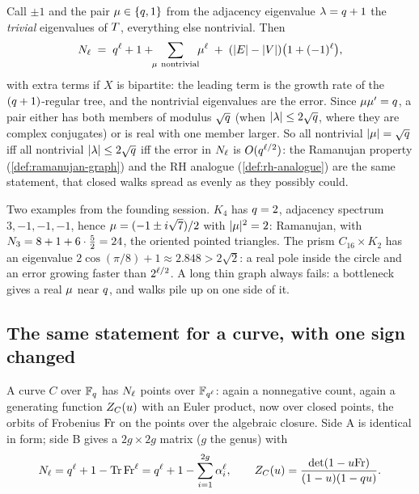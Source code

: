 Call $\pm1$ and the pair $\mu\in\{q,1\}$ from the adjacency eigenvalue $\lambda = q+1$ the
\emph{trivial} eigenvalues of $T$, everything else nontrivial. Then
\[
  N_{\ell} \;=\; q^{\ell} + 1 + \!\!\sum_{\mu\ \mathrm{nontrivial}}\!\! \mu^{\ell}
  \;+\; (|E|-|V|)\bigl(1+(-1)^{\ell}\bigr),\]
with extra terms if $X$ is bipartite: the leading term is the growth rate of the $(q+1)$-regular tree, and
the nontrivial eigenvalues are the error. Since $\mu\mu' = q$, a pair either has both members of
modulus $\sqrt{q}$ (when $|\lambda|\le2\sqrt{q}$, where they are complex conjugates) or is real with one
member larger. So all nontrivial $|\mu| = \sqrt{q}$ iff all nontrivial $|\lambda| \le 2\sqrt{q}$ iff
the error in $N_{\ell}$ is $O(q^{\ell/2})$: the Ramanujan property (\cref{def:ramanujan-graph}) and the
RH analogue (\cref{def:rh-analogue}) are the same statement, that closed walks spread as evenly as they
possibly could.

Two examples from the founding session. $K_4$ has $q=2$, adjacency spectrum $3,-1,-1,-1$, hence $\mu =
(-1\pm i\sqrt7)/2$ with $|\mu|^2 = 2$: Ramanujan, with $N_{3} = 8+1+6\cdot\tfrac52 = 24$, the
oriented pointed triangles. The prism $C_{16}\times K_2$ has an eigenvalue $2\cos(\pi/8)+1 \approx 2.848 >
2\sqrt2$: a real pole inside the circle and an error growing faster than $2^{\ell/2}$. A long thin graph
always fails: a bottleneck gives a real $\mu$ near $q$, and walks pile up on one side of it.

\subsection{The same statement for a curve, with one sign changed}

A curve $C$ over $\mathbb F_q$ has $N_{\ell}$ points over $\mathbb F_{q^{\ell}}$: again a nonnegative count, again a
generating function $Z_C(u)$ with an Euler product, now over closed points, the orbits of Frobenius
$\mathrm{Fr}$ on the points over the algebraic closure. Side A is identical in form; side B gives a $2g\times2g$
matrix ($g$ the genus) with
\[
N_{\ell} = q^{\ell} + 1 - \operatorname{Tr}\mathrm{Fr}^{\ell} = q^{\ell} + 1 - \sum_{i=1}^{2g}\alpha_{i}^{\ell}, \qquad
Z_C(u) = \frac{\det(1-u\mathrm{Fr})}{(1-u)(1-qu)} .
\]

